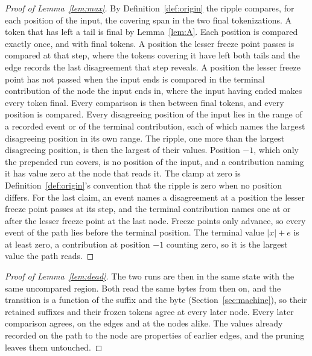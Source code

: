 \documentclass[11pt,a4paper]{article}
\theoremstyle{definition}
\theoremstyle{plain}
\begin{document}
\begin{proof}[Proof of Lemma~\ref{lem:max}]
By Definition~\ref{def:origin} the ripple compares, for each position of the input, the covering span in the two final
tokenizations. A token that has left a tail is final by Lemma~\ref{lem:A}. Each position is compared exactly once, and
with final tokens. A position the lesser freeze point passes is compared at that step, where the tokens covering it have
left both tails and the edge records the last disagreement that step reveals. A position the lesser freeze point has not
passed when the input ends is compared in the terminal contribution of the node the input ends in, where the input
having ended makes every token final. Every comparison is then between final tokens, and every position is compared.
Every disagreeing position of the input lies in the range of a recorded event or of the terminal contribution, each of
which names the largest disagreeing position in its own range. The ripple, one more than the largest disagreeing
position, is then the largest of their values. Position \(-1\), which only the prepended run covers, is no position of
the input, and a contribution naming it has value zero at the node that reads it. The clamp at zero is
Definition~\ref{def:origin}'s convention that the ripple is zero when no position differs. For the last claim, an event
names a disagreement at a position the lesser freeze point passes at its step, and the terminal contribution names one
at or after the lesser freeze point at the last node. Freeze points only advance, so every event of the path lies before
the terminal position. The terminal value \(|x| + e\) is at least zero, a contribution at position \(-1\) counting zero,
so it is the largest value the path reads.
\end{proof}

\begin{proof}[Proof of Lemma~\ref{lem:dead}]
The two runs are then in the same state with the same uncompared region. Both read the same bytes from then on, and the
transition is a function of the suffix and the byte (Section~\ref{sec:machine}), so their retained suffixes and their
frozen tokens agree at every later node. Every later comparison agrees, on the edges and at the nodes alike. The values
already recorded on the path to the node are properties of earlier edges, and the pruning leaves them untouched.
\end{proof}
\end{document}
